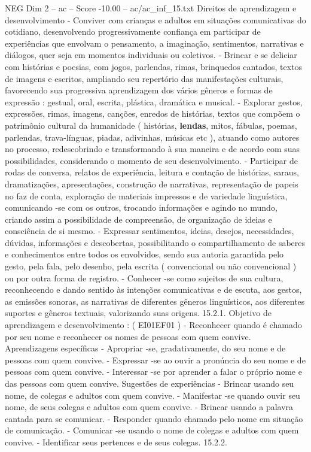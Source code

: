 \begin{textsample}{NEG Dim 2 – ac – Score -10.00 – ac/ac\_inf\_15.txt}
Direitos de aprendizagem e desenvolvimento - Conviver com crianças e adultos em situações comunicativas do cotidiano, desenvolvendo progressivamente confiança em participar de experiências que envolvam o pensamento, a imaginação, sentimentos, narrativas e diálogos, quer seja em momentos individuais ou coletivos. - Brincar e se deliciar com histórias e poesias, com jogos, parlendas, rimas, brinquedos cantados, textos de imagens e escritos, ampliando seu repertório das manifestações culturais, favorecendo sua progressiva aprendizagem dos vários gêneros e formas de expressão : gestual, oral, escrita, plástica, dramática e musical. - Explorar gestos, expressões, rimas, imagens, canções, enredos de histórias, textos que compõem o patrimônio cultural da humanidade ( histórias, \textbf{lendas}, mitos, fábulas, poemas, parlendas, trava-línguas, piadas, adivinhas, músicas etc ), atuando como autores no processo, redescobrindo e transformando à sua maneira e de acordo com suas possibilidades, considerando o momento de seu desenvolvimento. - Participar de rodas de conversa, relatos de experiência, leitura e contação de histórias, saraus, dramatizações, apresentações, construção de narrativas, representação de papeis no faz de conta, exploração de materiais impressos e de variedade linguística, comunicando -se com os outros, trocando informações e agindo no mundo, criando assim a possibilidade de compreensão, de organização de ideias e consciência de si mesmo. - Expressar sentimentos, ideias, desejos, necessidades, dúvidas, informações e descobertas, possibilitando o compartilhamento de saberes e conhecimentos entre todos os envolvidos, sendo sua autoria garantida pelo gesto, pela fala, pelo desenho, pela escrita ( convencional ou não convencional ) ou por outra forma de registro. - Conhecer -se como sujeitos de sua cultura, reconhecendo e dando sentido às intenções comunicativas e de escuta, aos gestos, as emissões sonoras, as narrativas de diferentes gêneros linguísticos, aos diferentes suportes e gêneros textuais, valorizando suas origens. 15.2.1.
Objetivo de aprendizagem e desenvolvimento : ( EI01EF01 ) - Reconhecer quando é chamado por seu nome e reconhecer os nomes de pessoas com quem convive.
Aprendizagens específicas - Apropriar -se, gradativamente, do seu nome e de pessoas com quem convive. - Expressar -se ao ouvir a pronúncia do seu nome e de pessoas com quem convive. - Interessar -se por aprender a falar o próprio nome e das pessoas com quem convive.
Sugestões de experiências - Brincar usando seu nome, de colegas e adultos com quem convive. - Manifestar -se quando ouvir seu nome, de seus colegas e adultos com quem convive. - Brincar usando a palavra cantada para se comunicar. - Responder quando chamado pelo nome em situação de comunicação. - Comunicar -se usando o nome de colegas e adultos com quem convive. - Identificar seus pertences e de seus colegas. 15.2.2.

\end{textsample}
